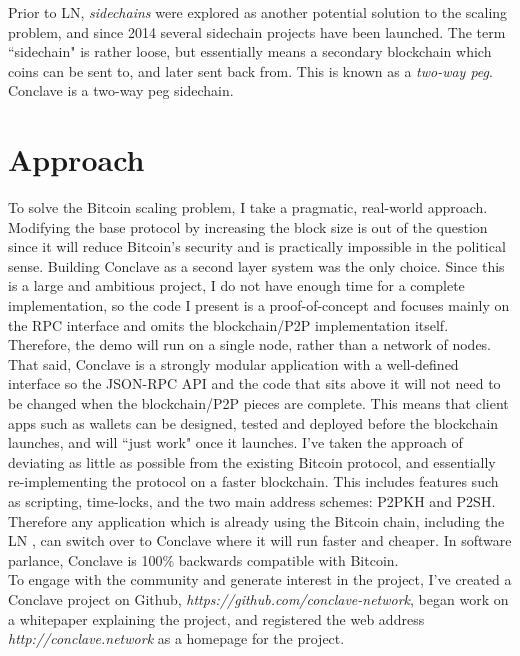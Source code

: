 \documentclass{report}
\begin{document}
		Prior to LN, \textit{sidechains} \cite{sidechains}  were explored as another potential solution to the scaling problem, and since 2014 several sidechain projects have been launched. The term ``sidechain" is rather loose, but essentially means a secondary blockchain which coins can be sent to, and later sent back from. This is known as a \textit{two-way peg}. Conclave is a two-way peg sidechain.
	\section{Approach}
		To solve the Bitcoin scaling problem, I take a pragmatic, real-world approach. Modifying the base protocol by increasing the block size is out of the question since it will reduce Bitcoin’s security and is practically impossible in the political sense. Building Conclave as a second layer system was the only choice. Since this is a large and ambitious project, I do not have enough time for a complete implementation, so the code I present is a proof-of-concept and focuses mainly on the RPC interface and omits the blockchain/P2P implementation itself. Therefore, the demo will run on a single node, rather than a network of nodes. \\
		
		That said, Conclave is a strongly modular application with a well-defined interface so the JSON-RPC API and the code that sits above it will not need to be changed when the blockchain/P2P pieces are complete. This means that client apps such as wallets can be designed, tested and deployed before the blockchain launches, and will ``just work" once it launches. I’ve taken the approach of deviating as little as possible from the existing Bitcoin protocol, and essentially re-implementing the protocol on a faster blockchain. This includes features such as scripting, time-locks, and the two main address schemes: P2PKH and P2SH. Therefore any application which is already using the Bitcoin chain, including the LN  , can switch over to Conclave where it will run faster and cheaper. In software parlance, Conclave is 100\% backwards compatible with Bitcoin.\\
		
		To engage with the community and generate interest in the project, I’ve created a Conclave project on Github, \textit{https://github.com/conclave-network}, began work on a whitepaper explaining the project, and registered the web address \textit{http://conclave.network} as a homepage for the project.
		
\end{document}
